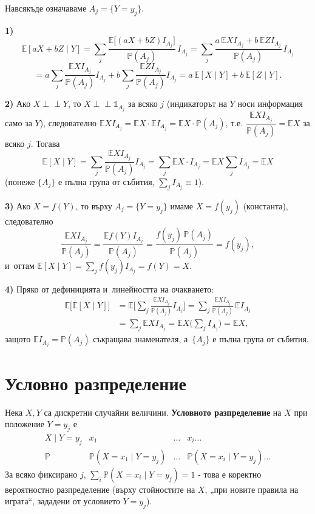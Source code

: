 \begin{proofbox}
Навсякъде означаваме $A_j=\{Y=y_j\}$.

\textbf{1)}
\[
  \mathbb E[aX+bZ\mid Y] = \sum_j \frac{\mathbb E\big[(aX+bZ)I_{A_j}\big]}{\mathbb P(A_j)}\,I_{A_j} = \sum_j \frac{a\,\mathbb EXI_{A_j}+b\,\mathbb EZI_{A_j}}{\mathbb P(A_j)}\,I_{A_j}
\]
\[
  = a\sum_j\frac{\mathbb EXI_{A_j}}{\mathbb P(A_j)}I_{A_j} + b\sum_j\frac{\mathbb EZI_{A_j}}{\mathbb P(A_j)}I_{A_j} = a\,\mathbb E[X\mid Y]+b\,\mathbb E[Z\mid Y].
\]

\textbf{2)} Ако $X\perp\!\!\!\perp Y$, то $X\perp\!\!\!\perp\mathbb
1_{A_j}$ за всяко $j$ (индикаторът на $Y$ носи информация само за
$Y$), следователно $\mathbb EXI_{A_j} = \mathbb EX\cdot
\mathbb EI_{A_j} = \mathbb EX\cdot\mathbb P(A_j)$, т.е.
$\dfrac{\mathbb EXI_{A_j}}{\mathbb P(A_j)}=\mathbb EX$ за
всяко $j$. Тогава
\[
  \mathbb E[X\mid Y] = \sum_j\frac{\mathbb EXI_{A_j}}{\mathbb P(A_j)}I_{A_j} = \sum_j \mathbb EX\cdot I_{A_j} = \mathbb EX\sum_j I_{A_j} = \mathbb EX
\]
(понеже $\{A_j\}$ е пълна група от събития, $\sum_j I_{A_j}
\equiv1$).

\textbf{3)} Ако $X=f(Y)$, то върху $A_j=\{Y=y_j\}$ имаме
$X=f(y_j)$ (константа), следователно
\[
  \frac{\mathbb EXI_{A_j}}{\mathbb P(A_j)} = \frac{\mathbb E f(Y)I_{A_j}}{\mathbb P(A_j)} = \frac{f(y_j)\,\mathbb P(A_j)}{\mathbb P(A_j)} = f(y_j),
\]
и~оттам $\mathbb E[X\mid Y] = \sum_j f(y_j)I_{A_j} = f(Y) = X$.

\textbf{4)} Пряко от дефиницията и~линейността на очакването:
\begin{align*}
  \mathbb E\big[\mathbb E[X\mid Y]\big] &= \mathbb E\Big[\sum_j\frac{\mathbb EXI_{A_j}}{\mathbb P(A_j)}I_{A_j}\Big] = \sum_j\frac{\mathbb EXI_{A_j}}{\mathbb P(A_j)}\,\mathbb EI_{A_j}\\
  &= \sum_j \mathbb EXI_{A_j} = \mathbb EX\Big(\sum_jI_{A_j}\Big) = \mathbb EX,
\end{align*}
защото $\mathbb EI_{A_j}=\mathbb P(A_j)$ съкращава знаменателя,
а~$\{A_j\}$ е пълна група от събития. \qedbg
\end{proofbox}

\section{Условно разпределение}

\begin{defbox}
Нека $X,Y$ са дискретни случайни величини. \textbf{Условното
разпределение} на $X$ при положение $Y=y_j$ е
\[
  \begin{array}{c|ccc}
    X\mid Y{=}y_j & x_1 & \dots & x_i \dots\\\hline
    \mathbb P & \mathbb P(X{=}x_1\mid Y{=}y_j) & \dots & \mathbb P(X{=}x_i\mid Y{=}y_j)\dots
  \end{array}
\]
За всяко фиксирано $j$, $\sum_i \mathbb P(X=x_i\mid Y=y_j)=1$ - това
е коректно вероятностно разпределение (върху стойностите на $X$,
„при новите правила на играта“, зададени от условието $Y=y_j$).
\end{defbox}

